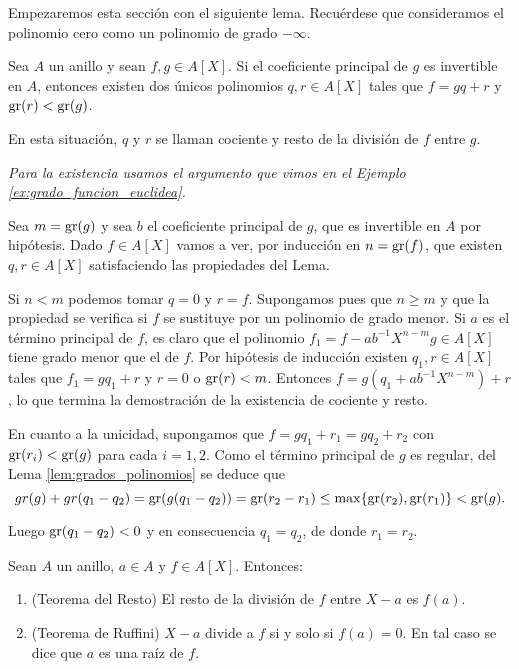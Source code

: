 Empezaremos esta sección con el siguiente lema. Recuérdese que consideramos el polinomio cero como un polinomio de grado $-\infty$.

\begin{lemma}{}{}
Sea $A$ un anillo y sean $f,g\in A[X]$. Si el coeficiente principal de $g$ es invertible en $A$, entonces existen dos únicos polinomios $q,r\in A[X]$ tales que $f = gq + r$ y $\operatorname{gr}(r) < \operatorname{gr}(g)$.

En esta situación, $q$ y $r$ se llaman cociente y resto de la división de $f$ entre $g$.
\end{lemma}

\begin{proofbox}
\emph{Para la existencia usamos el argumento que vimos en el Ejemplo \ref{ex:grado_funcion_euclidea}.}

Sea $m = \operatorname{gr}(g)$ y sea $b$ el coeficiente principal de $g$, que es invertible en $A$ por hipótesis. Dado $f\in A[X]$ vamos a ver, por inducción en $n = \operatorname{gr}(f)$, que existen $q, r\in A[X]$ satisfaciendo las propiedades del Lema. 

Si $n<m$ podemos tomar $q = 0$ y $r = f$. Supongamos pues que $n\geq m$ y que la propiedad se verifica si $f$ se sustituye por un polinomio de grado menor. Si $a$ es el término principal de $f$, es claro que el polinomio $f_{1} = f - ab^{-1} X^{n-m} g\in A[X]$ tiene grado menor que el de $f$. Por hipótesis de inducción existen $q_{1}, r\in A[X]$ tales que $f_{1} = gq_{1} + r$ y $r = 0$ o $\operatorname{gr}(r) < m$. Entonces $f = g(q_{1} + ab^{-1} X^{n-m}) + r$, lo que termina la demostración de la existencia de cociente y resto.

En cuanto a la unicidad, supongamos que $f=gq_{1}+r_{1}=gq_{2}+r_{2}$ con $\operatorname{gr}(r_{i}) < \operatorname{gr}(g)$ para cada $i=1,2$. Como el término principal de $g$ es regular, del Lema \ref{lem:grados_polinomios} se deduce que
\[
gr(g)+gr(q_{1}-q_{2})= \operatorname{gr}(g(q_{1 }-q_{2}))= \operatorname{gr}(r_{2}-r_{1})\leq\max\{\operatorname{gr}(r_{2}), \operatorname{gr}(r_{1})\} < \operatorname{gr}(g).
\]

Luego $\operatorname{gr}(q_{1}-q_{2})<0$ y en consecuencia $q_{1}=q_{2}$, de donde $r_{1}=r_{2}$.
\end{proofbox}

\begin{proposition}{}{}
Sean $A$ un anillo, $a\in A$ y $f\in A[X]$. Entonces:

\begin{enumerate}
\item (Teorema del Resto) El resto de la división de $f$ entre $X-a$ es $f(a)$.
\item (Teorema de Ruffini) $X-a$ divide a $f$ si y solo si $f(a)=0$. En tal caso se dice que $a$ es una raíz de $f$.
\end{enumerate}
\end{proposition}

